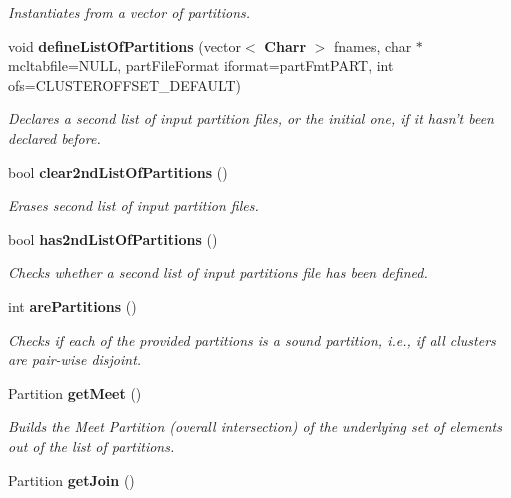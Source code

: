 \begin{CompactItemize}
\begin{CompactList}\small\item\em Instantiates from a vector of partitions. \item\end{CompactList}\item 
void {\bf define\-List\-Of\-Partitions} (vector$<$ {\bf Charr} $>$ fnames, char $\ast$mcltabfile=NULL, part\-File\-Format iformat=part\-Fmt\-PART, int ofs=CLUSTEROFFSET\_\-DEFAULT)\label{classPartitionStats_a4}

\begin{CompactList}\small\item\em Declares a second list of input partition files, or the initial one, if it hasn't been declared before. \item\end{CompactList}\item 
bool {\bf clear2nd\-List\-Of\-Partitions} ()\label{classPartitionStats_a5}

\begin{CompactList}\small\item\em Erases second list of input partition files. \item\end{CompactList}\item 
bool {\bf has2nd\-List\-Of\-Partitions} ()\label{classPartitionStats_a6}

\begin{CompactList}\small\item\em Checks whether a second list of input partitions file has been defined. \item\end{CompactList}\item 
int {\bf are\-Partitions} ()\label{classPartitionStats_a7}

\begin{CompactList}\small\item\em Checks if each of the provided partitions is a sound partition, i.e., if all clusters are pair-wise disjoint. \item\end{CompactList}\item 
Partition {\bf get\-Meet} ()\label{classPartitionStats_a8}

\begin{CompactList}\small\item\em Builds the Meet Partition (overall intersection) of the underlying set of elements out of the list of partitions. \item\end{CompactList}\item 
Partition {\bf get\-Join} ()\label{classPartitionStats_a9}


\end{CompactItemize}
